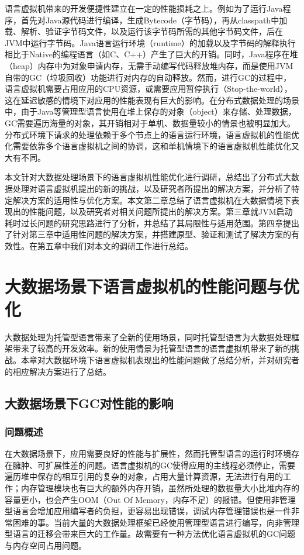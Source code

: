 \documentclass[lang=cn,12pt,a4paper,cite=authoryear]{elegantpaper}
\begin{document}
语言虚拟机带来的开发便捷性建立在一定的性能损耗之上。例如为了运行Java程序，首先对Java源代码进行编译，生成Bytecode（字节码），再从classpath中加载、解析、验证字节码文件，以及运行该字节码所需的其他字节码文件，后在JVM中运行字节码。Java语言运行环境（runtime）的加载以及字节码的解释执行相比于Native的编程语言（如C、C++）产生了巨大的开销。同时，Java程序在堆（heap）内存中为对象申请内存，无需手动编写代码释放堆内存，而是使用JVM自带的GC（垃圾回收）功能进行对内存的自动释放。然而，进行GC的过程中，语言虚拟机需要占用应用的CPU资源，或需要应用暂停执行（Stop-the-world），这在延迟敏感的情境下对应用的性能表现有巨大的影响。在分布式数据处理的场景中，由于Java等管理型语言使用在堆上保存的对象（object）来存储、处理数据，GC需要遍历海量的对象，其开销相对于单机、数据量较小的情景也被明显加大。分布式环境下请求的处理依赖于多个节点上的语言运行环境，语言虚拟机的性能优化需要依靠多个语言虚拟机之间的协调，这和单机情境下的语言虚拟机性能优化又大有不同。

本文针对大数据处理场景下的语言虚拟机性能优化进行调研，总结出了分布式大数据处理对语言虚拟机提出的新的挑战，以及研究者所提出的解决方案，并分析了特定解决方案的适用性与优化方案。本文第二章总结了语言虚拟机在大数据情境下表现出的性能问题，以及研究者对相关问题所提出的解决方案。第三章就JVM启动耗时过长问题的研究思路进行了分析，并总结了其局限性与适用范围。第四章提出了针对第三章中适用性问题的解决方案，并搭建原型、验证和测试了解决方案的有效性。在第五章中我们对本文的调研工作进行总结。

\section{大数据场景下语言虚拟机的性能问题与优化}
大数据处理为托管型语言带来了全新的使用场景，同时托管型语言为大数据处理框架带来了较高的开发效率。新的使用情景为托管型语言的语言虚拟机带来了新的挑战。本章对大数据环境下语言虚拟机表现出的性能问题做了总结分析，并对研究者的相应解决方案进行了总结。

\subsection{大数据场景下GC对性能的影响}
\subsubsection{问题概述}
在大数据场景下，应用需要良好的性能与扩展性，然而托管型语言的运行时环境存在臃肿、可扩展性差的问题。语言虚拟机的GC使得应用的主线程必须停止，需要遍历堆中保存的相互引用的复杂的对象，占用大量计算资源，无法进行有用的工作；内存管理模块也有巨大的额外内存开销，虽然所处理的数据量大小比堆内存的容量更小，也会产生OOM（Out Of Memory，内存不足）的报错。但使用非管理型语言会增加应用编写者的负担，更容易出现错误，调试内存管理错误也是一件非常困难的事。当前大量的大数据处理框架已经使用管理型语言进行编写，向非管理型语言的迁移会带来巨大的工作量。故需要有一种方法优化语言虚拟机的GC问题与内存空间占用问题。
\end{document}

